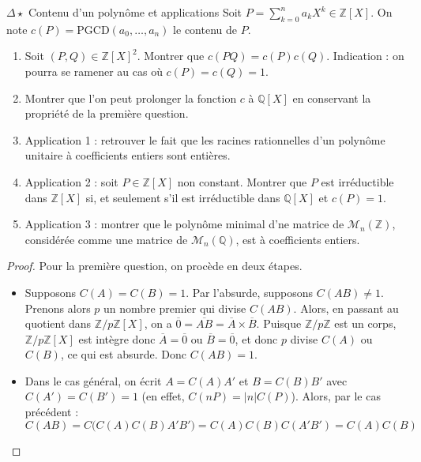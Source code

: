 \documentclass[french,a4paper]{article}
\newcommand{\Z}{\mathbb{Z}}
\newcommand{\Q}{\mathbb{Q}}
\theoremstyle{plain}
\theoremstyle{definition}
\theoremstyle{remark}
\begin{document}
\begin{ex}[Moulin.AG.72]{$\Delta\star$ Contenu d'un polynôme et applications}
	Soit $P=\displaystyle\sum_{k=0}^{n}a_kX^k\in\Z[X]$. On note $c(P)=\text{PGCD}(a_0,\ldots,a_n)$ le contenu de $P$.
	\begin{enumerate}
		\item Soit $(P,Q)\in\Z[X]^2$. Montrer que $c(PQ)=c(P)c(Q)$. Indication : on pourra se ramener au cas où $c(P)=c(Q)=1$.
		\item Montrer que l'on peut prolonger la fonction $c$ à $\Q[X]$ en conservant la propriété de la première question.
		\item Application 1 : retrouver le fait que les racines rationnelles d'un polynôme unitaire à coefficients entiers sont entières.
		\item Application 2 : soit $P\in\Z[X]$ non constant. Montrer que $P$ est irréductible dans $\Z[X]$ si, et seulement s'il est irréductible dans $\Q[X]$ et $c(P)=1$.
		\item Application 3 : montrer que le polynôme minimal d'ne matrice de $\mathcal{M}_n(\Z)$, considérée comme une matrice de $\mathcal{M}_n(\Q)$, est à coefficients entiers.
	\end{enumerate}
\end{ex}
\begin{proof}
	Pour la première question, on procède en deux étapes.
	\begin{itemize}
		\item Supposons $C(A)=C(B)=1$. Par l'absurde, supposons $C(AB)\ne 1$. Prenons alors $p$ un nombre premier qui divise $C(AB)$. Alors, en passant au quotient dans $\Z/p\Z[X]$, on a $\overline{0}=\overline{AB}=\overline{A}\times\overline{B}$. Puisque $\Z/p\Z$ est un corps, $\Z/p\Z[X]$ est intègre donc $\overline{A}=\overline{0}$ ou $\overline{B}=\overline{0}$, et donc $p$ divise $C(A)$ ou $C(B)$, ce qui est absurde. Donc $C(AB)=1$.
		\item Dans le cas général, on écrit $A=C(A)A'$ et $B=C(B)B'$ avec $C(A')=C(B')=1$ (en effet, $C(nP)=\lvert n\rvert C(P)$). Alors, par le cas précédent : $$C(AB)=C\big(C(A)C(B)A'B'\big)=C(A)C(B)C(A'B')=C(A)C(B)$$
	\end{itemize}
\end{proof}
\end{document}
